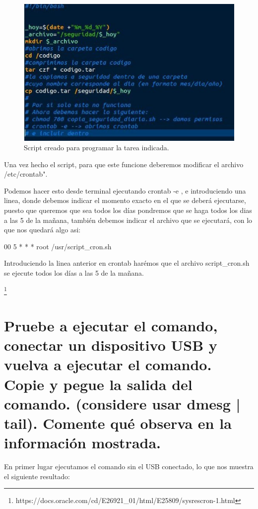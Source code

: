 \begin{figure}[H]
\begin{center}
\includegraphics[scale=0.6]{imagenes/ejercicio2.eps}
\caption{Script creado para programar la tarea indicada.}
\end{center}
\end{figure}


Una vez hecho el script, para que este funcione deberemos modificar el archivo /etc/crontab".

Podemos hacer esto desde terminal ejecutando crontab -e , e introduciendo una linea, donde debemos indicar el momento exacto en el que se deberá ejecutarse, puesto que queremos que sea todos los días pondremos que se haga todos los dias a las 5 de la mañana, también debemos indicar el archivo que se ejecutará, con lo que nos quedará algo asi:


00 5 * * * root /usr/script\_cron.sh 
\linebreak

Introduciendo la linea anterior en crontab harémos que el archivo script\_cron.sh se ejecute todos los días a las 5 de la mañana.

\footnote{https://docs.oracle.com/cd/E26921\_01/html/E25809/sysrescron-1.html}

\section{Pruebe a ejecutar el comando, conectar un dispositivo USB y vuelva a ejecutar el comando. Copie y pegue la salida del comando. (considere usar dmesg | tail). Comente qué observa en la información mostrada.}

En primer lugar ejecutamos el comando sin el USB conectado, lo que nos muestra el siguiente resultado:

